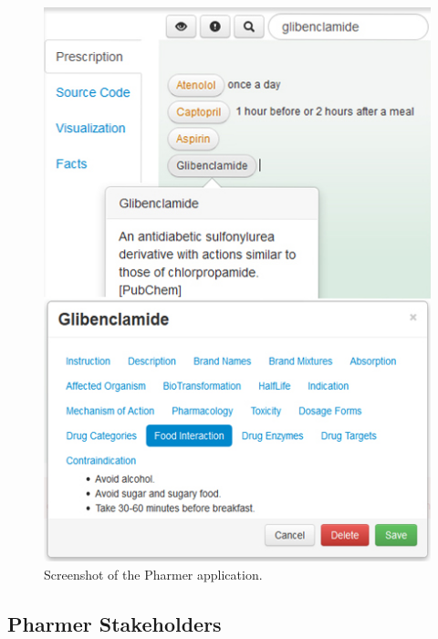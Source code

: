 \documentclass[10pt, conference, compsocconf]{IEEEtran}
\begin{document}
\begin{figure}[tb]
	\centering
		\includegraphics[width=0.9\columnwidth]{images/screenshot.jpg}
	\caption{Screenshot of the Pharmer application.}
	\label{fig:screenshot}
\end{figure}

\subsection{Pharmer Stakeholders}
\label{sec:stake}
\end{document}
